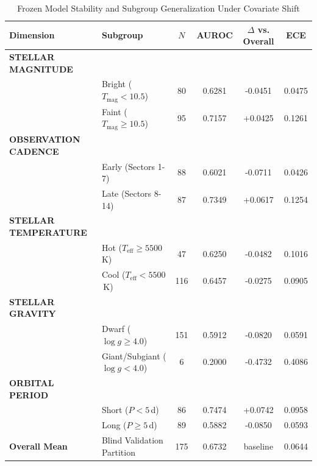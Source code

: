\begin{table}[htbp]
\centering
\caption{Frozen Model Stability and Subgroup Generalization Under Covariate Shift}
\label{tab:distribution_shift}
\begin{tabular}{llcccc}
\hline\hline
Dimension & Subgroup & $N$ & AUROC & $\Delta$ vs. Overall & ECE \\
\hline
\textbf{STELLAR MAGNITUDE} & & & & & \\
 & Bright ($T_{\text{mag}} < 10.5$) & 80 & 0.6281 & -0.0451 & 0.0475 \\
 & Faint ($T_{\text{mag}} \ge 10.5$) & 95 & 0.7157 & +0.0425 & 0.1261 \\
\hline
\textbf{OBSERVATION CADENCE} & & & & & \\
 & Early (Sectors 1-7) & 88 & 0.6021 & -0.0711 & 0.0426 \\
 & Late (Sectors 8-14) & 87 & 0.7349 & +0.0617 & 0.1254 \\
\hline
\textbf{STELLAR TEMPERATURE} & & & & & \\
 & Hot ($T_{\text{eff}} \ge 5500$\,K) & 47 & 0.6250 & -0.0482 & 0.1016 \\
 & Cool ($T_{\text{eff}} < 5500$\,K) & 116 & 0.6457 & -0.0275 & 0.0905 \\
\hline
\textbf{STELLAR GRAVITY} & & & & & \\
 & Dwarf ($\log g \ge 4.0$) & 151 & 0.5912 & -0.0820 & 0.0591 \\
 & Giant/Subgiant ($\log g < 4.0$) & 6 & 0.2000 & -0.4732 & 0.4086 \\
\hline
\textbf{ORBITAL PERIOD} & & & & & \\
 & Short ($P < 5$\,d) & 86 & 0.7474 & +0.0742 & 0.0958 \\
 & Long ($P \ge 5$\,d) & 89 & 0.5882 & -0.0850 & 0.0593 \\
\hline
\textbf{Overall Mean} & Blind Validation Partition & 175 & 0.6732 & baseline & 0.0644 \\
\hline
\end{tabular}
\end{table}
